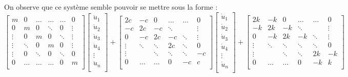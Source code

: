 \documentclass[10pt]{article}
\begin{document}
On observe que ce système semble pouvoir se mettre sous la forme :
$$
\begin{bmatrix}
m & 0 & \ldots & \ldots & \ldots & 0\\
0  & m & 0 & \ddots & 0 & \vdots\\
\vdots  & 0 & m & 0 & \ddots & \vdots\\
\vdots  & \ddots & 0 & m & 0 & \vdots\\
\vdots  & 0 & \ddots & 0 & \ddots & 0\\
0  & \ldots & \ldots & \ldots & 0 & m\\
\end{bmatrix}
\begin{bmatrix}
\ddot{u}_1\\
\ddot{u}_2\\
\ddot{u}_3\\
\ddot{u}_4\\
\vdots\\
\ddot{u}_n\\
\end{bmatrix}
+
\begin{bmatrix}
2c & -c & 0 & \ldots & \ldots & 0\\
-c  & 2c & -c & \ddots &  & \vdots\\
0  & -c & 2c & -c & \ddots & \vdots\\
\vdots  & \ddots & \ddots & 2c &\ddots & 0\\
\vdots  &  & \ddots &\ddots & \ddots & -c\\
0  & \ldots & \ldots & 0 & -c & c\\
\end{bmatrix}
\begin{bmatrix}
\dot{u}_1\\
\dot{u}_2\\
\dot{u}_3\\
\dot{u}_4\\
\vdots\\
\dot{u}_n\\
\end{bmatrix}
+
\begin{bmatrix}
2k & -k & 0 & \ldots & \ldots & 0\\
-k  & 2k & -k & \ddots &  & \vdots\\
0  & -k & 2k & -k & \ddots & \vdots\\
\vdots  & \ddots & \ddots &  \ddots&\ddots & 0\\
\vdots  &  & \ddots &\ddots & 2k & -k\\
0  & \ldots & \ldots & 0 & -k & k\\

\end{bmatrix}$$
\end{document}
